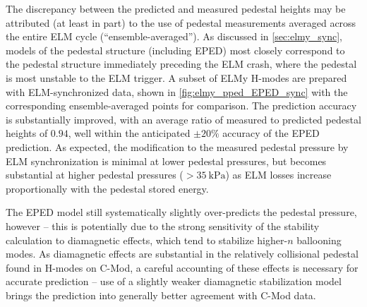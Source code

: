 The discrepancy between the predicted and measured pedestal heights may be attributed (at least in part) to the use of pedestal measurements averaged across the entire ELM cycle (``ensemble-averaged'').  As discussed in \cref{sec:elmy_sync}, models of the pedestal structure (including EPED) most closely correspond to the pedestal structure immediately preceding the ELM crash, where the pedestal is most unstable to the ELM trigger.  A subset of ELMy H-modes are prepared with ELM-synchronized data, shown in \cref{fig:elmy_pped_EPED_sync} with the corresponding ensemble-averaged points for comparison.  The prediction accuracy is substantially improved, with an average ratio of measured to predicted pedestal heights of $0.94$, well within the anticipated $\pm 20\%$ accuracy of the EPED prediction.  As expected, the modification to the measured pedestal pressure by ELM synchronization is minimal at lower pedestal pressures, but becomes substantial at higher pedestal pressures ($> \SI{35}{\kilo\pascal}$) as ELM losses increase proportionally with the pedestal stored energy.

The EPED model still systematically slightly over-predicts the pedestal pressure, however -- this is potentially due to the strong sensitivity of the stability calculation to diamagnetic effects, which tend to stabilize higher-$n$ ballooning modes.  As diamagnetic effects are substantial in the relatively collisional pedestal found in H-modes on C-Mod, a careful accounting of these effects is necessary for accurate prediction -- use of a slightly weaker diamagnetic stabilization model brings the prediction into generally better agreement with C-Mod data.

\begin{figure}[t]
 \pushtooutside
\end{figure}


